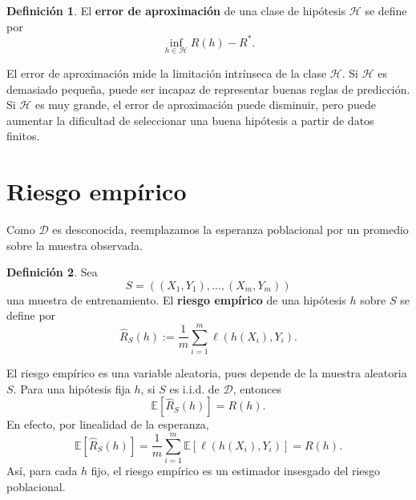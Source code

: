 \documentclass[11pt]{report}
\newenvironment{tcolorbox}[1][]{\par\medskip\noindent\ignorespaces}{\par\medskip}
\theoremstyle{definition}
\newtheorem{definicion}{Definición}[section]
\theoremstyle{plain}
\numberwithin{equation}{section}
\begin{document}
\begin{tcolorbox}[colback=blue!8, colframe=blue!8, boxrule=0pt]
\begin{definicion}
El \textbf{error de aproximación} de una clase de hipótesis \(\mathcal{H}\) se define por
\begin{equation*}
    \inf_{h\in\mathcal{H}}R(h)-R^*.
\end{equation*}
\end{definicion}
\end{tcolorbox}

El error de aproximación mide la limitación intrínseca de la clase \(\mathcal{H}\). Si \(\mathcal{H}\) es demasiado pequeña, puede ser incapaz de representar buenas reglas de predicción. Si \(\mathcal{H}\) es muy grande, el error de aproximación puede disminuir, pero puede aumentar la dificultad de seleccionar una buena hipótesis a partir de datos finitos.

\section{Riesgo empírico}

Como \(\mathcal{D}\) es desconocida, reemplazamos la esperanza poblacional por un promedio sobre la muestra observada.

\begin{tcolorbox}[colback=blue!8, colframe=blue!8, boxrule=0pt]
\begin{definicion}
Sea
\begin{equation*}
    S=((X_1,Y_1),\ldots,(X_m,Y_m))
\end{equation*}
una muestra de entrenamiento. El \textbf{riesgo empírico} de una hipótesis \(h\) sobre \(S\) se define por
\begin{equation*}
    \widehat{R}_S(h)
    :=
    \frac{1}{m}
    \sum_{i=1}^{m}
    \ell(h(X_i),Y_i).
\end{equation*}
\end{definicion}
\end{tcolorbox}

El riesgo empírico es una variable aleatoria, pues depende de la muestra aleatoria \(S\). Para una hipótesis fija \(h\), si \(S\) es i.i.d. de \(\mathcal{D}\), entonces
\begin{equation*}
    \mathbb{E}[\widehat{R}_S(h)]
    =
    R(h).
\end{equation*}
En efecto, por linealidad de la esperanza,
\begin{equation*}
    \mathbb{E}[\widehat{R}_S(h)]
    =
    \frac{1}{m}
    \sum_{i=1}^{m}
    \mathbb{E}[\ell(h(X_i),Y_i)]
    =
    R(h).
\end{equation*}
Así, para cada \(h\) fijo, el riesgo empírico es un estimador insesgado del riesgo poblacional.
\end{document}
